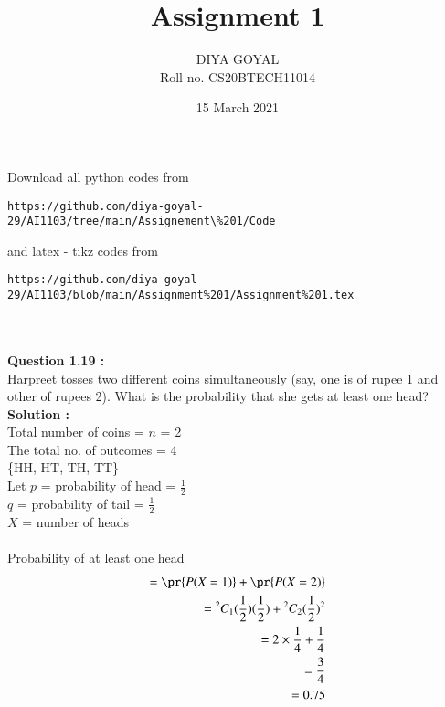 \documentclass[journal,12pt,twocolumn]{IEEEtran}
\title{Assignment 1}
\author{DIYA GOYAL\\
Roll no. CS20BTECH11014}
\date{15 March 2021}
\begin{document}
\maketitle
\large Download all python codes from\\
\begin{lstlisting}
https://github.com/diya-goyal-29/AI1103/tree/main/Assignement\%201/Code
\end{lstlisting}


\large and latex - tikz codes from \\
\begin{lstlisting}
https://github.com/diya-goyal-29/AI1103/blob/main/Assignment%201/Assignment%201.tex
\end{lstlisting}
\\ \\
\large\textbf{Question 1.19 :} \\
Harpreet tosses two different coins simultaneously (say, one is of rupee 1 and other of rupees 2). What is the probability that she gets at least one head? \\
\large\textbf{Solution :}\\
Total number of coins = $n$ = 2\\
The total no. of outcomes = 4\\ 
\{HH, HT, TH, TT\}\\
Let $p$ = probability of head = $\frac{1}{2}$\\
$q$ = probability of tail = $\frac{1}{2}$\\
$X$ = number of heads\\ \\
Probability of at least one head\\
    \begin{align*}
         = \pr{P(X = 1)} + \pr{P(X = 2)} \\
         = {^2 C _1} (\frac{1}{2})(\frac{1}{2}) + {^2 C _2} (\frac{1}{2})^2\\ 
         = 2 \times \frac{1}{4} + \frac{1}{4}\\
         = \frac{3}{4}\\
         = 0.75
    \end{align*}
\end{document}
